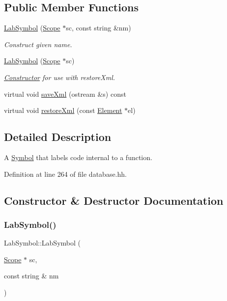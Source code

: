 \subsection*{Public Member Functions}
\begin{DoxyCompactItemize}
\item 
\mbox{\hyperlink{class_lab_symbol_a76e210c2bacb1a5deffed6b390f9ad1c}{Lab\+Symbol}} (\mbox{\hyperlink{class_scope}{Scope}} $\ast$sc, const string \&nm)
\begin{DoxyCompactList}\small\item\em Construct given name. \end{DoxyCompactList}\item 
\mbox{\hyperlink{class_lab_symbol_a4e7a6b23242e0a18660c00480d55d1f9}{Lab\+Symbol}} (\mbox{\hyperlink{class_scope}{Scope}} $\ast$sc)
\begin{DoxyCompactList}\small\item\em \mbox{\hyperlink{class_constructor}{Constructor}} for use with restore\+Xml. \end{DoxyCompactList}\item 
virtual void \mbox{\hyperlink{class_lab_symbol_aa923d358bf51dff4957f202e34d140be}{save\+Xml}} (ostream \&s) const
\item 
virtual void \mbox{\hyperlink{class_lab_symbol_a856b8496e06601889db4abc4ac76fa71}{restore\+Xml}} (const \mbox{\hyperlink{class_element}{Element}} $\ast$el)
\end{DoxyCompactItemize}


\subsection{Detailed Description}
A \mbox{\hyperlink{class_symbol}{Symbol}} that labels code internal to a function. 

Definition at line 264 of file database.\+hh.



\subsection{Constructor \& Destructor Documentation}
\mbox{\label{class_lab_symbol_a76e210c2bacb1a5deffed6b390f9ad1c}} 
\subsubsection{\texorpdfstring{LabSymbol()}{LabSymbol()}\hspace{0.1cm}{\footnotesize\ttfamily [1/2]}}
{\footnotesize\ttfamily Lab\+Symbol\+::\+Lab\+Symbol (\begin{DoxyParamCaption}\item[{\mbox{\hyperlink{class_scope}{Scope}} $\ast$}]{sc,  }\item[{const string \&}]{nm }\end{DoxyParamCaption})}



